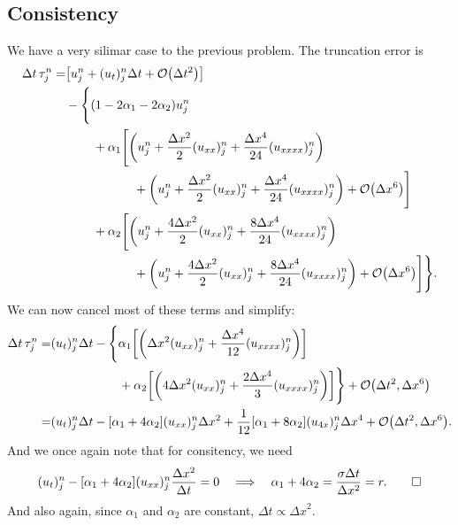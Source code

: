\documentclass[11pt,letter, swedish, english
]{article}
\newcommand{\Dx}{\ensuremath{\Delta{x}}}
\newcommand{\Dt}{\ensuremath{\Delta{t}}}
\begin{document}
\subsection{Consistency}
We have a very silimar case to the previous problem. The truncation
error is
\begin{equation}
\begin{aligned}
\Dt\,\tau_j^n=& \qty[u_j^n+(u_t)_j^n\Dt+\order{\Dt^2}]\\
&-\Bigg\{(1-2\alpha_1-2\alpha_2)u_j^n
\\ &\hspace{22pt}+\alpha_1\Bigg[
\qty(u_j^n+\frac{\Dx^2}{2}(u_{xx})_j^n+\frac{\Dx^4}{24}(u_{xxxx})_j^n)
\\ &\hspace{55pt}
+\qty(u_j^n+\frac{\Dx^2}{2}(u_{xx})_j^n+\frac{\Dx^4}{24}(u_{xxxx})_j^n)
+\order{\Dx^6}\Bigg]
\\ &\hspace{22pt}
+\alpha_2\Bigg[
\qty(u_j^n+\frac{4\Dx^2}{2}(u_{xx})_j^n+\frac{8\Dx^4}{24}(u_{xxxx})_j^n)
\\ &\hspace{55pt}
+\qty(u_j^n+\frac{4\Dx^2}{2}(u_{xx})_j^n+\frac{8\Dx^4}{24}(u_{xxxx})_j^n)
+\order{\Dx^6}\Bigg]
\Bigg\}.
\end{aligned}
\end{equation}
We can now cancel most of these terms and simplify:
\begin{equation}
\begin{aligned}
\Dt\,\tau_j^n=& (u_t)_j^n\Dt
-\Bigg\{\alpha_1\qty[
\qty(\Dx^2(u_{xx})_j^n+\frac{\Dx^4}{12}(u_{xxxx})_j^n)]
\\ &\hspace{55pt}
+\alpha_2\qty[
\qty(4\Dx^2(u_{xx})_j^n+\frac{2\Dx^4}{3}(u_{xxxx})_j^n)]
\Bigg\} +\order{\Dt^2, \Dx^6}\\
=& (u_t)_j^n\Dt-[\alpha_1+4\alpha_2](u_{xx})_j^n\Dx^2
+\frac{1}{12}[\alpha_1+8\alpha_2](u_{4x})_j^n\Dx^4
+\order{\Dt^2, \Dx^6}.
\end{aligned}
\end{equation}
And we once again note that for consitency, we need 
\begin{equation}\label{eq:2a_end}
(u_t)_j^n-[\alpha_1+4\alpha_2](u_{xx})_j^n\frac{\Dx^2}{\Dt}=0
\quad\Longrightarrow\quad
\alpha_1+4\alpha_2=\frac{\sigma\Dt}{\Dx^2}=r.
\qed
\end{equation}
And also again, since $\alpha_1$ and $\alpha_2$ are constant,
$\Dt\propto\Dx^2$. 
\end{document}
